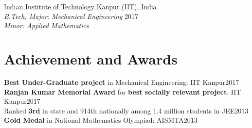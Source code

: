 \documentclass[letterpaper]{twentysecondcv} %
\begin{document}
\href{https://www.iitk.ac.in/}{Indian Institute of Technology Kanpur (IIT), India} \\
{\sl B.Tech, Major: Mechanical Engineering }%
  \hfill %
  2017 \\
\phantom{x}\hspace{5.3ex} {\sl Minor: Applied Mathematics}\\

\section{Achievement and Awards}

\textbf{Best Under-Graduate project} in Mechanical Engineering: IIT Kanpur\hfill2017 \\
\textbf{Ranjan Kumar Memorial Award} for \textbf{best socially relevant project}: IIT Kanpur\hfill2017\\
Ranked \textbf{3rd} in state and 914th nationally among 1.4 million students in JEE\hfill2013 \\
\textbf{Gold Medal} in National Mathematics Olympiad: AISMTA\hfill2013



\end{document}
